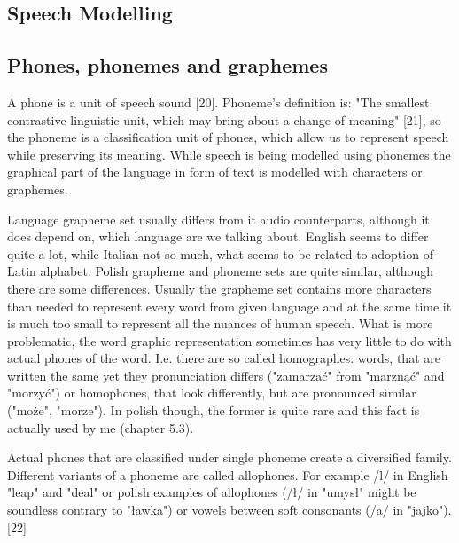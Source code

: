 \documentclass[12pt,a4paper,english]{article}
\begin{document}
\newpage
\begin{center}
    \section{Speech Modelling}
\end {center}
\setcounter{equation}{0}

\subsection{Phones, phonemes and graphemes}

A phone is a unit of speech sound [20]. Phoneme's definition is: "The smallest contrastive linguistic unit, which may bring about a change of meaning" [21], so the phoneme is a classification unit of phones, which allow us to represent speech while preserving its meaning.  While speech is being modelled using phonemes the graphical part of the language in form of text is modelled with characters or graphemes. \newline

Language grapheme set usually differs from it audio counterparts, although it does depend on, which language are we talking about. English seems to differ quite a lot, while Italian not so much, what seems to be related to adoption of Latin alphabet. Polish grapheme and phoneme sets are quite similar, although there are some differences. Usually the grapheme set contains more characters than needed to represent every word from given language and at the same time it is much too small to represent all the nuances of human speech. What is more problematic, the word graphic representation sometimes has very little to do with actual phones of the word. I.e. there are so called homographes: words, that are written the same yet they pronunciation differs ("zamarzać" from "marznąć" and "morzyć") or homophones, that look differently, but are pronounced similar ("może", "morze"). In polish though, the former is quite rare and this fact is actually used by me (chapter 5.3). \newline


Actual phones that are classified under single phoneme create a diversified family.  Different variants of a phoneme are called allophones. For example /l/ in English "leap" and "deal" or polish examples of allophones (/ł/ in "umysł" might be soundless contrary to "ławka") or vowels between soft consonants (/a/ in "jajko"). [22] \newline
\end{document}

